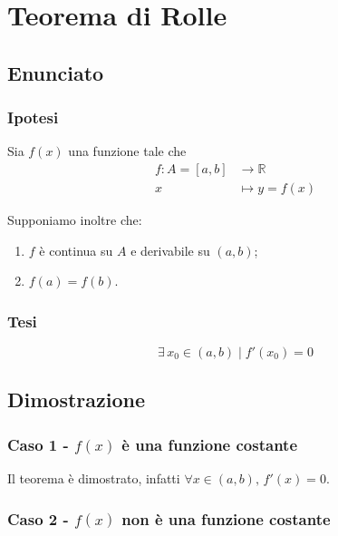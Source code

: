 \documentclass[../../analisi1]{subfiles}
\begin{document}
    \chapter{Teorema di Rolle}
    \label{teoRolle}

        \section*{Enunciato}

            \subsection*{Ipotesi}

                Sia \(f(x)\) una funzione tale che
                \begin{align*}
                    f : A = [a, b] &\longrightarrow \mathbb{R}\\
                    x &\longmapsto y = f(x) 
                \end{align*}

                Supponiamo inoltre che:

                \begin{enumerate}
                    \indentitem \item \(f\) è continua su \(A\) e derivabile su \((a, b)\);
                    \indentitem \item \(f(a) = f(b)\).
                \end{enumerate}

            \subsection*{Tesi}

                \[\exists \, x_0 \in (a,b) \; | \; f'(x_0) = 0 \]

        \section*{Dimostrazione}

            \subsection*{Caso 1 - \(f(x)\) è una funzione costante}

                Il teorema è dimostrato, infatti \(\forall x \in (a,b), \, f'(x) = 0\).

            \subsection*{Caso 2 - \(f(x)\) non è una funzione costante}
\end{document}
